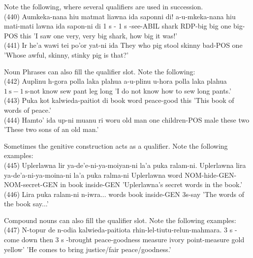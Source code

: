 \documentclass[10pt]{article}
\begin{document}
Note the following, where several qualifiers are used in succession.\\
(440) Aumkeka-nana hiu matmat liawna ida saponni di! a-u-mkeka-nana hiu mati-mati lawna ida sapon-ni di 1 s - 1 s -see-ABIL shark RDP-big big one big-POS this 'I saw one very, very big shark, how big it was!'\\
(441) Ir he'a wawi tei po'or yat-ni ida They who pig stool skinny bad-POS one 'Whose awful, skinny, stinky pig is that?'

Noun Phrases can also fill the qualifier slot. Note the following:\\
(442) Auplinu h-gora polla laka plahua a-u-plinu u-hora polla laka plahua \(1 \mathrm{~s}-1 \mathrm{~s}\)-not know sew pant leg long 'I do not know how to sew long pants.'\\
(443) Puka kot kalwieda-paitiot di book word peace-good this 'This book of words of peace.'\\
(444) Hamto' ida up-ni muanu ri woru old man one children-POS male these two 'These two sons of an old man.'

Sometimes the genitive construction acts as a qualifier. Note the following examples:\\
(445) Uplerlawna lir ya-de'e-ni-ya-moiyan-ni la'a puka ralam-ni. Uplerlawna lira ya-de'a-ni-ya-moina-ni la'a puka ralma-ni Uplerlawna word NOM-hide-GEN-NOM-secret-GEN in book inside-GEN 'Uplerlawna's secret words in the book.'\\
(446) Lira puka ralam-ni n-iwra... words book inside-GEN 3s-say 'The words of the book say...'

Compound nouns can also fill the qualifier slot. Note the following examples:\\
(447) N-topur de n-odia kalwieda-paitiota rhin-lel-tiutu-relun-mahmara. 3 s -come down then 3 s -brought peace-goodness measure ivory point-measure gold yellow' 'He comes to bring justice/fair peace/goodness.'
\end{document}
